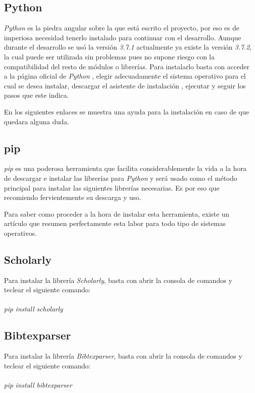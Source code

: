 \subsection{Python}
\emph{Python} es la piedra angular sobre la que está escrito el proyecto, por eso es de imperiosa necesidad tenerlo instalado para continuar con el desarrollo. Aunque durante el desarrollo se usó la versión \emph{3.7.1} actualmente ya existe la versión \emph{3.7.2}, la cual puede ser utilizada sin problemas pues no supone riesgo con la compatibilidad del resto de módulos o librerías.
Para instalarlo basta con acceder a la página oficial de \emph{Python}\cite{python_descargas} , elegir adecuadamente el sistema operativo para el cual se desea instalar, descargar el asistente de instalación  , ejecutar y seguir los pasos que este indica.

En los siguientes enlaces se muestra una ayuda para la instalación en caso de que quedara alguna duda. \cite{python_w10}\cite{python_allos}

\subsection{pip}
\emph{pip} es una poderosa herramienta que facilita considerablemente la vida a la hora de descargar e instalar las librerías para \emph{Python} y será usado como el método principal para instalar las siguientes librerías necesarias. Es por eso que recomiendo fervientemente su descarga y uso.

Para saber como proceder a la hora de instalar esta herramienta, existe un artículo que resumen perfectamente esta labor para todo tipo de sistemas operativos.\cite{pip}
\subsection{Scholarly}
Para instalar la librería \emph{Scholarly}, basta con abrir la consola de comandos y teclear el siguiente comando:\\ \\
\emph{pip install scholarly}

\subsection{Bibtexparser}
Para instalar la librería \emph{Bibtexparser}, basta con abrir la consola de comandos y teclear el siguiente comando:\\ \\
\emph{pip install bibtexparser}

